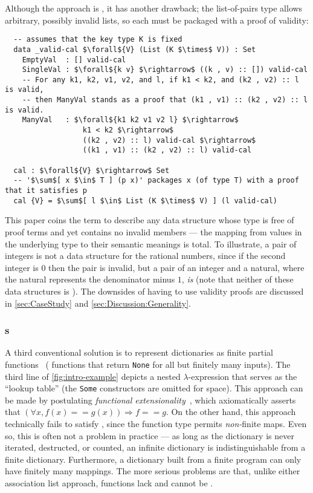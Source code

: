 Although the \cal{} approach is \extensional, it has another drawback; the list-of-pairs type allows arbitrary, possibly invalid lists, so each \cal{} must be packaged with a proof of validity:
\begin{lstlisting}
  -- assumes that the key type K is fixed
  data _valid-cal $\forall${V} (List (K $\times$ V)) : Set
    EmptyVal  : [] valid-cal
    SingleVal : $\forall${k v} $\rightarrow$ ((k , v) :: []) valid-cal
    -- For any k1, k2, v1, v2, and l, if k1 < k2, and (k2 , v2) :: l is valid,
    -- then ManyVal stands as a proof that (k1 , v1) :: (k2 , v2) :: l is valid.
    ManyVal   : $\forall${k1 k2 v1 v2 l} $\rightarrow$
                  k1 < k2 $\rightarrow$
                  ((k2 , v2) :: l) valid-cal $\rightarrow$
                  ((k1 , v1) :: (k2 , v2) :: l) valid-cal

  cal : $\forall${V} $\rightarrow$ Set
  -- '$\sum$[ x $\in$ T ] (p x)' packages x (of type T) with a proof that it satisfies p
  cal {V} = $\sum$[ l $\in$ List (K $\times$ V) ] (l valid-cal)
\end{lstlisting}

This paper coins the term \firstUseGoal{\semanticallyTotal} to describe any data structure whose type is free of proof terms and yet contains no invalid members ---
%
\ie{} the mapping from values in the underlying type to their semantic meanings is total.
%
To illustrate, a pair of integers is not a \semanticallyTotal{} data structure for the rational numbers, since if the second integer is $0$ then the pair is invalid,
%
but a pair of an integer and a natural, where the natural represents the denominator minus $1$, \emph{is} \semanticallyTotal{} (note that neither of these data structures is \extensional).
%
The downsides of having to use validity proofs are discussed in \autoref{sec:CaseStudy} and \autoref{sec:Discussion:Generality}.

\subsubsection{\Fpf{}s}

A third conventional solution is to represent dictionaries as finite partial functions~\cite[Maps]{Pierce:SF1} (\ie{} functions that return \texttt{None} for all but finitely many inputs).
%
The third line of \autoref{fig:intro-example} depicts a nested $\lambda$-expression that serves as the ``lookup table'' (the \texttt{Some} constructors are omitted for space).
%
This approach can be made \extensional{} by postulating \emph{functional extensionality}~\mbox{\cite[Logic]{Pierce:SF1}}, which axiomatically asserts that $(\forall x, f(x) == g(x)) \Rightarrow f == g$.
%
On the other hand, this approach technically fails to satisfy \SemTot, since the function type permits \emph{non-}finite maps.
%
Even so, this is often not a problem in practice --- as long as the dictionary is never iterated, destructed, or counted, an infinite dictionary is indistinguishable from a finite dictionary.
%
Furthermore, a dictionary built from a finite program can only have finitely many mappings.
%
The more serious problems are that, unlike either association list approach, functions lack \firstUseGoal{\DecidableEq} and cannot be \firstUseGoal{\destructed}.

